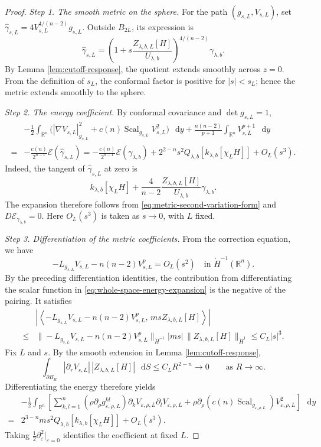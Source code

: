 \documentclass[11pt]{article}
\numberwithin{equation}{section}
\theoremstyle{remark}
\newcommand{\R}{\mathbb R}
\newcommand{\eps}{\varepsilon}
\newcommand{\dd}{\mathop{}\!\mathrm{d}}
\begin{document}
\begin{proof}
\emph{Step 1. The smooth metric on the sphere.}
{For the path \((g_{s,L},V_{s,L})\), set} \(\widehat\gamma_{s,L}=4V_{s,L}^{4/(n-2)}g_{s,L}\).
Outside \(B_{2L}\), its expression is
\[
 \widehat\gamma_{s,L}
 =\left(1+s\frac{Z_{\lambda,b,L}[H]}{U_{\lambda,b}}\right)^{4/(n-2)}
 \gamma_{\lambda,b}.
\]
{By Lemma  \ref{lem:cutoff-response}, the quotient extends smoothly
across \(z=0\). From the definition of \(s_L\), the conformal factor is
positive for \(|s|<s_L\); hence the metric extends smoothly to the sphere.}

\emph{Step 2. The energy coefficient.}
{By conformal covariance and \(\det g_{s,L}=1\),}
 {
\begin{equation}\label{eq:whole-space-energy-expansion}
 \begin{aligned}
 &-\frac12\int_{\R^n}
 \bigl(|\nabla V_{s,L}|_{g_{s,L}}^2+c(n)\operatorname{Scal}_{g_{s,L}}V_{s,L}^2\bigr)\,\dd y
 +\frac{n(n-2)}{p+1}\int_{\R^n}V_{s,L}^{p+1}\,\dd y\\
 {}={}&-\frac{c(n)}{2^{n-1}}\mathcal E(\widehat\gamma_{s,L})=-\frac{c(n)}{2^{n-1}}\mathcal E(\gamma_{\lambda,b})
 +2^{2-n}s^2 Q_{\lambda,b}[k_{\lambda,b}[\chi_LH]]
 +O_L(s^3).
 \end{aligned}
\end{equation}
}
Indeed, the tangent of \(\widehat\gamma_{s,L}\) at zero is
\[
 k_{\lambda,b}[\chi_LH]
 +\frac4{n-2}\frac{Z_{\lambda,b,L}[H]}{U_{\lambda,b}}\gamma_{\lambda,b}.
\]
{The expansion therefore follows from
\eqref{eq:metric-second-variation-form} and
\(D\mathcal E_{\gamma_{\lambda,b}}=0\).}
Here \(O_L(s^3)\) is taken as \(s\to0\), with \(L\) fixed.

\emph{Step 3. Differentiation of the metric coefficients.}
{From the correction equation, we have}
\[
 -L_{g_{s,L}}V_{s,L}-n(n-2)V_{s,L}^p=O_L(s^2)
 \quad\text{in }\dot H^{-1}(\R^n).
\]
By the preceding differentiation identities, the contribution from
differentiating the scalar function in
\eqref{eq:whole-space-energy-expansion} is the negative of the pairing.
It satisfies
\[
 \begin{aligned}
 &\left|\left\langle
 -L_{g_{s,L}}V_{s,L}-n(n-2)V_{s,L}^p,\,
 msZ_{\lambda,b,L}[H]\right\rangle\right|\\
 {}\le{}&
 \|-L_{g_{s,L}}V_{s,L}-n(n-2)V_{s,L}^p\|_{\dot H^{-1}}
 |ms|\,\|Z_{\lambda,b,L}[H]\|_{\dot H^1}
 \le C_L|s|^3.
 \end{aligned}
\]
{Fix \(L\) and \(s\). By the smooth extension in
Lemma  \ref{lem:cutoff-response},}
\[
 \int_{\partial B_R}
 |\partial_rV_{s,L}|\,|Z_{\lambda,b,L}[H]|\,\dd S
 \le C_LR^{2-n}\to0
 \qquad\text{as }R\to\infty.
\]
Differentiating the energy therefore yields
 {
\[
 \begin{aligned}
 &-\frac12\int_{\R^n}
 \left[
 \sum_{k,l=1}^n(\rho\partial_\rho g_{\eps,\rho,L}^{kl})
 \partial_kV_{\eps,\rho,L}\partial_lV_{\eps,\rho,L}
 +\rho\partial_\rho(c(n)\operatorname{Scal}_{g_{\eps,\rho,L}})V_{\eps,\rho,L}^2
 \right]\,\dd y\\
 {}={}&2^{3-n}m s^2
  Q_{\lambda,b}[k_{\lambda,b}[\chi_LH]]+O_L(s^3).
 \end{aligned}
\]
}
Taking \(\frac{1}{2}\partial_\eps^2|_{\eps=0}\) identifies the coefficient at
fixed \(L\).


\end{proof}
\end{document}
